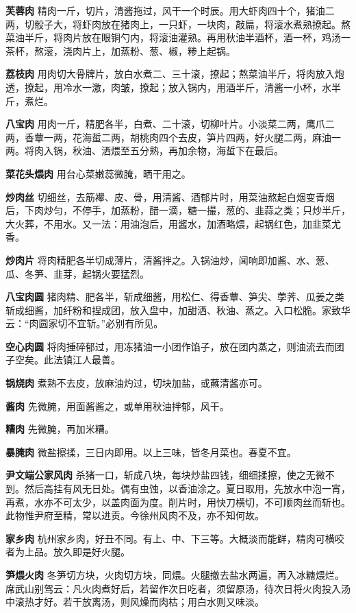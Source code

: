 \documentclass[]{article}
\begin{document}
\textbf{芙蓉肉}
精肉一斤，切片，清酱拖过，风干一个时辰。用大虾肉四十个，猪油二两，切骰子大，将虾肉放在猪肉上，一只虾，一块肉，敲扁，将滚水煮熟撩起。熬菜油半斤，将肉片放在眼铜勺内，将滚油灌熟。再用秋油半酒杯，酒一杯，鸡汤一茶杯，熬滚，浇肉片上，加蒸粉、葱、椒，糁上起锅。

\textbf{荔枝肉}
用肉切大骨牌片，放白水煮二、三十滚，撩起；熬菜油半斤，将肉放入炮透，撩起，用冷水一激，肉皱，撩起；放入锅内，用酒半斤，清酱一小杯，水半斤，煮烂。

\textbf{八宝肉}
用肉一斤，精肥各半，白煮、二十滚，切柳叶片。小淡菜二两，鹰爪二两，香蕈一两，花海蜇二两，胡桃肉四个去皮，笋片四两，好火腿二两，麻油一两。将肉入锅，秋油、洒煨至五分熟，再加余物，海蜇下在最后。

\textbf{菜花头煨肉} 用台心菜嫩蕊微腌，晒干用之。

\textbf{炒肉丝}
切细丝，去筋襻、皮、骨，用清酱、酒郁片时，用菜油熬起白烟变青烟后，下肉炒匀，不停手，加蒸粉，醋一滴，糖一撮，葱的、韭蒜之类；只炒半斤，大火葬，不用水。又一法：用油泡后，用酱水，加酒略煨，起锅红色，加韭菜尤香。

\textbf{炒肉片}
将肉精肥各半切成薄片，清酱拌之。入锅油炒，闻响即加酱、水、葱、瓜、冬笋、韭芽，起锅火要猛烈。

\textbf{八宝肉圆}
猪肉精、肥各半，斩成细酱，用松仁、得香蕈、笋尖、荸荠、瓜姜之类斩成细酱，加纤粉和捏成团，放入盘中，加甜洒、秋油、蒸之。入口松脆。家致华云：``肉圆家切不宜斩。''必别有所见。

\textbf{空心肉圆}
将肉捶碎郁过，用冻猪油一小团作馅子，放在团内蒸之，则油流去而团子空矣。此法镇江人最善。

\textbf{锅烧肉} 煮熟不去皮，放麻油灼过，切块加盐，或蘸清酱亦可。

\textbf{酱肉} 先微腌，用面酱酱之，或单用秋油拌郁，风干。

\textbf{糟肉} 先微腌，再加米糟。

\textbf{暴腌肉} 微盐擦揉，三日内即用。以上三味，皆冬月菜也。春夏不宜。

\textbf{尹文端公家风肉}
杀猪一口，斩成八块，每块炒盐四钱，细细揉擦，使之无微不到。然后高挂有风无日处。偶有虫蚀，以香油涂之。夏日取用，先放水中泡一宵，再煮，水亦不可太少，以盖肉面为度。削片时，用快刀横切，不可顺肉丝而斩也。此物惟尹府至精，常以进贡。今徐州风肉不及，亦不知何故。

\textbf{家乡肉}
杭州家乡肉，好丑不同。有上、中、下三等。大概淡而能鲜，精肉可横咬者为上品。放久即是好火腿。

\textbf{笋煨火肉}
冬笋切方块，火肉切方块，同煨。火腿撤去盐水两遍，再入冰糖煨烂。席武山别驾云：凡火肉煮好后，若留作次日吃者，须留原汤，待次日将火肉投入汤中滚热才好。若干放离汤，则风燥而肉枯；用白水则又味淡。
\end{document}
